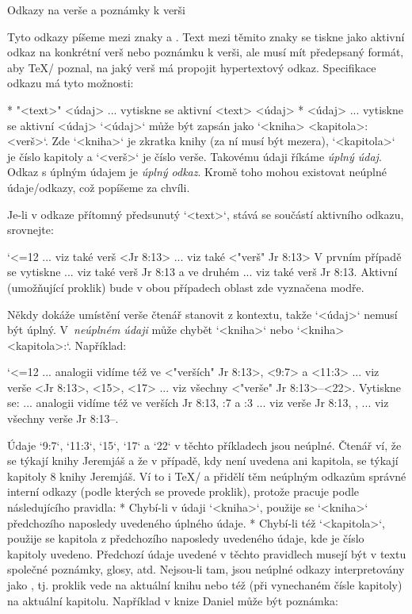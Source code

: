 \secc Odkazy na verše a poznámky k verši

Tyto odkazy píšeme mezi znaky \code{<} a \code{>}. Text mezi těmito znaky se tiskne jako
aktivní odkaz na konkrétní verš nebo poznámku k verši, ale musí mít předepsaný formát, aby
\TeX/ poznal, na jaký verš má propojit hypertextový odkaz.
Specifikace odkazu má tyto možnosti:

\begitems
* "<text>" <údaj> ... vytiskne se aktivní <text> <údaj>
* <údaj> ... vytiskne se aktivní <údaj>
\enditems
%
`<údaj>` může být zapsán jako
`<kniha> <kapitola>:<verš>`. Zde `<kniha>` je zkratka knihy (za ní musí být
mezera), `<kapitola>` je číslo kapitoly a `<verš>` je číslo verše.
%
Takovému údaji říkáme {\em úplný údaj}. 
Odkaz s úplným údajem je {\em úplný odkaz}.
Kromě toho mohou existovat neúplné údaje/odkazy, což popíšeme za chvíli.

Je-li v odkaze přítomný předsunutý `<text>`, stává se součástí aktivního odkazu,
srovnejte:

\begtt \catcode`<=12
... viz také verš <Jr 8:13>
... viz také <"verš" Jr 8:13>
\endtt
V prvním případě se vytiskne ... viz také verš {\Blue Jr 8:13} a ve druhém
... viz také {\Blue verš Jr 8:13}. Aktivní (umožňující proklik) bude v obou případech
oblast zde vyznačena modře.

Někdy dokáže umístění verše čtenář stanovit z kontextu, takže `<údaj>`
nemusí být úplný. V~{\em neúplném údaji} může chybět `<kniha>` nebo
`<kniha> <kapitola>:`. Například:

\begtt \catcode`<=12
... analogii vidíme též ve <"verších" Jr 8:13>, <9:7> a <11:3>
... viz verše <Jr 8:13>, <15>, <17>
... viz všechny <"verše" Jr 8:13>--<22>.
\endtt
Vytiskne se:
... analogii vidíme též ve {\Blue verších Jr 8:13}, {:7} a {:3}
... viz verše {\Blue Jr 8:13}, {}, {}
... viz všechny {\Blue verše Jr 8:13}--{}.

Údaje `9:7`, `11:3`, `15`, `17` a `22` v těchto příkladech jsou neúplné. Čtenář ví, že se týkají
knihy Jeremjáš a že v případě, kdy není uvedena ani kapitola, se týkají kapitoly 8 knihy
Jeremjáš. Ví to i \TeX/ a přidělí těm neúplným odkazům správné interní
odkazy (podle kterých se provede proklik), protože pracuje podle
následujícího pravidla:
\begitems
* Chybí-li v údaji `<kniha>`, použije se `<kniha>` předchozího naposledy uvedeného úplného
  údaje.
* Chybí-li též `<kapitola>`, použije se kapitola z předchozího naposledy uvedeného údaje, kde je
  číslo kapitoly uvedeno.
\enditems
Předchozí údaje uvedené v těchto pravidlech musejí být v textu
společné poznámky, glosy, atd. Nejsou-li tam, jsou neúplné odkazy 
interpretovány jako , tj. proklik vede na
aktuální knihu nebo též (při vynechaném čísle kapitoly) na aktuální
kapitolu. Například v knize Daniel může být poznámka:

